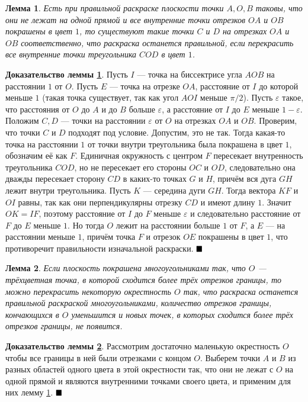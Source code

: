 \documentclass[12pt,a4paper]{article}
\newtheorem{lemma}{Лемма}
\renewcommand{\qed}{$\blacksquare \vspace{5mm}$}
\begin{document}
\begin{lemma} \label{l6.1}
	Есть при правильной раскраске плоскости точки $A, O, B$ таковы, что они не лежат на одной прямой и все внутренние точки отрезков $OA$ и $OB$ покрашены в цвет $1$, то существуют такие точки $C$ и $D$ на отрезках $OA$ и $OB$ соответственно, что раскраска останется правильной, если перекрасить все внутренние точки треугольника $COD$ в цвет $1$.
\end{lemma}

\textbf{Доказательство леммы \ref{l6.1}}. Пусть $I$ --- точка на биссектрисе угла $AOB$ на расстоянии $1$ от $O$. Пусть $E$ --- точка на отрезке $OA$, расстояние от $I$ до которой меньше $1$ (такая точка существует, так как угол $AOI$ меньше $\pi / 2$). Пусть $\varepsilon$ такое, что расстояния от $O$ до $A$ и до $B$ больше $\varepsilon$, а расстояние от $I$ до $E$ меньше $1 - \varepsilon$. Положим $C, D$ --- точки на расстоянии $\varepsilon$ от $O$ на отрезках $OA$ и $OB$. Проверим, что точки $C$ и $D$ подходят под условие. Допустим, это не так. Тогда какая-то точка на расстоянии $1$ от точки внутри треугольника была покрашена в цвет $1$, обозначим её как $F$. Единичная окружность с центром $F$ пересекает внутренность треугольника $COD$, но не пересекает его стороны $OC$ и $OD$, следовательно она дважды пересекает сторону $CD$ в каких-то точках $G$ и $H$, причём вся дуга $GH$ лежит внутри треугольника. Пусть $K$ --- середина дуги $GH$. Тогда вектора $KF$ и $OI$ равны, так как они перпендикулярны отрезку $CD$ и имеют длину $1$. Значит $OK=IF$, поэтому расстояние от $I$ до $F$ меньше $\varepsilon$ и следовательно расстояние от $F$ до $E$ меньше $1$. Но тогда $O$ лежит на расстоянии больше $1$ от $F$, а $E$ --- на расстоянии меньше $1$, причём точка $F$ и отрезок $OE$ покрашены в цвет $1$, что противоречит правильности изначальной раскраски. \qed

\begin{lemma} \label{l6.2}
	Если плоскость покрашена многоугольниками так, что $O$ --- трёхцветная точка, в которой сходится более трёх отрезков границы, то можно перекрасить некоторую окрестность $O$ так, что раскраска останется правильной раскраской многоугольниками, количество отрезков границы, кончающихся в $O$ уменьшится и новых точек, в которых сходится более трёх отрезков границы, не появится.
\end{lemma}

\textbf{Доказательство леммы \ref{l6.2}}. Рассмотрим достаточно маленькую окрестность $O$ чтобы все границы в ней были отрезками с концом $O$. Выберем точки $A$ и $B$ из разных областей одного цвета в этой окрестности так, что они не лежат с $O$ на одной прямой и являются внутренними точками своего цвета, и применим для них лемму \ref{l6.1}. \qed
\end{document}

